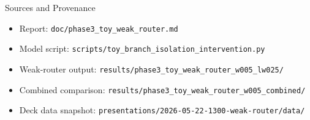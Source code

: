\documentclass[aspectratio=169]{beamer}
\begin{document}
\begin{frame}{Sources and Provenance}
  \scriptsize
  \begin{itemize}
    \item Report: \texttt{doc/phase3\_toy\_weak\_router.md}
    \item Model script: \texttt{scripts/toy\_branch\_isolation\_intervention.py}
    \item Weak-router output: \texttt{results/phase3\_toy\_weak\_router\_w005\_lw025/}
    \item Combined comparison: \texttt{results/phase3\_toy\_weak\_router\_w005\_combined/}
    \item Deck data snapshot: \texttt{presentations/2026-05-22-1300-weak-router/data/}
  \end{itemize}
\end{frame}
\end{document}

